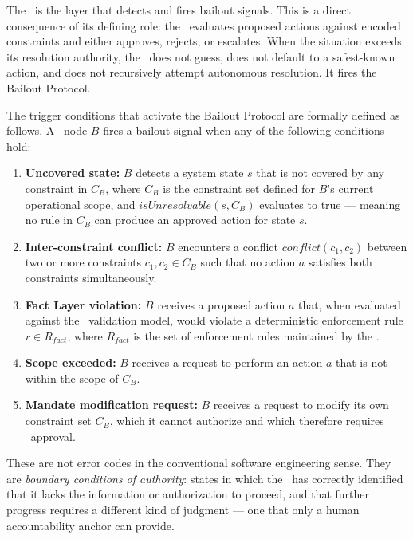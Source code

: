 The \bounds\ is the layer that detects and fires bailout signals. This is a direct consequence of its defining role: the \bounds\ evaluates proposed actions against encoded constraints and either approves, rejects, or escalates. When the situation exceeds its resolution authority, the \bounds\ does not guess, does not default to a safest-known action, and does not recursively attempt autonomous resolution. It fires the Bailout Protocol.

The trigger conditions that activate the Bailout Protocol are formally defined as follows. A \bounds\ node $B$ fires a bailout signal when any of the following conditions hold:

\begin{enumerate}
\item \textbf{Uncovered state:} $B$ detects a system state $s$ that is not covered by any constraint in $C_B$, where $C_B$ is the constraint set defined for $B$'s current operational scope, and $isUnresolvable(s, C_B)$ evaluates to true --- meaning no rule in $C_B$ can produce an approved action for state $s$.

\item \textbf{Inter-constraint conflict:} $B$ encounters a conflict $conflict(c_1, c_2)$ between two or more constraints $c_1, c_2 \in C_B$ such that no action $a$ satisfies both constraints simultaneously.

\item \textbf{Fact Layer violation:} $B$ receives a proposed action $a$ that, when evaluated against the \fact\ validation model, would violate a deterministic enforcement rule $r \in R_{fact}$, where $R_{fact}$ is the set of enforcement rules maintained by the \fact.

\item \textbf{Scope exceeded:} $B$ receives a request to perform an action $a$ that is not within the scope of $C_B$.

\item \textbf{Mandate modification request:} $B$ receives a request to modify its own constraint set $C_B$, which it cannot authorize and which therefore requires \purpose\ approval.
\end{enumerate}

These are not error codes in the conventional software engineering sense. They are \textit{boundary conditions of authority}: states in which the \bounds\ has correctly identified that it lacks the information or authorization to proceed, and that further progress requires a different kind of judgment --- one that only a human accountability anchor can provide.

